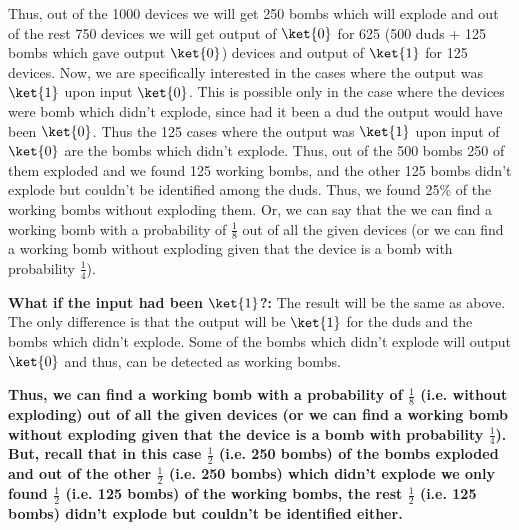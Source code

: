 \documentclass[12pt, oneside]{book}
\theoremstyle{definition}
\theoremstyle{definition}
\theoremstyle{remark}
\begin{document}
\begin{enumerate}
    Thus, out of the 1000 devices we will get 250 bombs which will explode and out of the rest 750 devices we will get output of $\ket{0}$ for 625 (500 duds + 125 bombs which gave output $\ket{0}$) devices and output of $\ket{1}$ for 125 devices. Now, we are specifically interested in the cases where the output was $\ket{1}$ upon input $\ket{0}$. This is possible
    only in the case where the devices were bomb which didn't explode, since had it been a dud the output would have been $\ket{0}$. Thus the 125 cases where the output was $\ket{1}$ upon input of $\ket{0}$ are the bombs which didn't explode. 
    Thus, out of the 500 bombs 250 of them exploded and we found 125 working bombs, and the other 125 bombs didn't explode but couldn't be identified among the duds. Thus, we found 25\% of the working bombs without exploding them. Or, we can say that the we can find a working bomb with a probability of $\frac{1}{8}$ out of all the given devices (or we can find a working bomb without exploding given that the device is a bomb with probability $\frac{1}{4}$).
    
    \textbf{What if the input had been $\ket{1}$?: }The result will be the same as above. The only difference is that the output will be $\ket{1}$ for the duds and the bombs which didn't explode. Some of the bombs which didn't explode will output $\ket{0}$ and thus, can be detected as working bombs.
    
    \textbf{Thus, we can find a working bomb with a probability of $\frac{1}{8}$ (i.e. without exploding) out of all the given devices (or we can find a working bomb without exploding given that the device is a bomb with probability $\frac{1}{4}$). But, recall that in this case $\frac{1}{2}$ (i.e. 250 bombs) of the bombs exploded and out of the other $\frac{1}{2}$ (i.e. 250 bombs) which didn't explode we only found $\frac{1}{2}$ (i.e. 125 bombs) of the working bombs, the rest $\frac{1}{2}$ (i.e. 125 bombs) didn't explode but couldn't be identified either.}


\end{enumerate}
\end{document}
